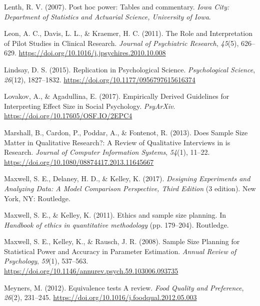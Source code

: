 \documentclass[
  english,
  ,jou, a4paper,floatsintext]{apa6}
\newlength{\cslhangindent}
\newenvironment{cslreferences}%
  {\setlength{\parindent}{0pt}%
  \everypar{\setlength{\hangindent}{\cslhangindent}}\ignorespaces}%
  {\par}
\begin{document}
\begin{cslreferences}
\leavevmode\hypertarget{ref-lenth_post_2007}{}%
Lenth, R. V. (2007). Post hoc power: Tables and commentary. \emph{Iowa City: Department of Statistics and Actuarial Science, University of Iowa}.

\leavevmode\hypertarget{ref-leon_role_2011}{}%
Leon, A. C., Davis, L. L., \& Kraemer, H. C. (2011). The Role and Interpretation of Pilot Studies in Clinical Research. \emph{Journal of Psychiatric Research}, \emph{45}(5), 626--629. \url{https://doi.org/10.1016/j.jpsychires.2010.10.008}

\leavevmode\hypertarget{ref-lindsay_replication_2015}{}%
Lindsay, D. S. (2015). Replication in Psychological Science. \emph{Psychological Science}, \emph{26}(12), 1827--1832. \url{https://doi.org/10.1177/0956797615616374}

\leavevmode\hypertarget{ref-lovakov_empirically_2017}{}%
Lovakov, A., \& Agadullina, E. (2017). Empirically Derived Guidelines for Interpreting Effect Size in Social Psychology. \emph{PsyArXiv}. \url{https://doi.org/10.17605/OSF.IO/2EPC4}

\leavevmode\hypertarget{ref-marshall_does_2013}{}%
Marshall, B., Cardon, P., Poddar, A., \& Fontenot, R. (2013). Does Sample Size Matter in Qualitative Research?: A Review of Qualitative Interviews in is Research. \emph{Journal of Computer Information Systems}, \emph{54}(1), 11--22. \url{https://doi.org/10.1080/08874417.2013.11645667}

\leavevmode\hypertarget{ref-maxwell_designing_2017}{}%
Maxwell, S. E., Delaney, H. D., \& Kelley, K. (2017). \emph{Designing Experiments and Analyzing Data: A Model Comparison Perspective, Third Edition} (3 edition). New York, NY: Routledge.

\leavevmode\hypertarget{ref-maxwell_ethics_2011}{}%
Maxwell, S. E., \& Kelley, K. (2011). Ethics and sample size planning. In \emph{Handbook of ethics in quantitative methodology} (pp. 179--204). Routledge.

\leavevmode\hypertarget{ref-maxwell_sample_2008}{}%
Maxwell, S. E., Kelley, K., \& Rausch, J. R. (2008). Sample Size Planning for Statistical Power and Accuracy in Parameter Estimation. \emph{Annual Review of Psychology}, \emph{59}(1), 537--563. \url{https://doi.org/10.1146/annurev.psych.59.103006.093735}

\leavevmode\hypertarget{ref-meyners_equivalence_2012}{}%
Meyners, M. (2012). Equivalence tests A review. \emph{Food Quality and Preference}, \emph{26}(2), 231--245. \url{https://doi.org/10.1016/j.foodqual.2012.05.003}


\end{cslreferences}
\end{document}
